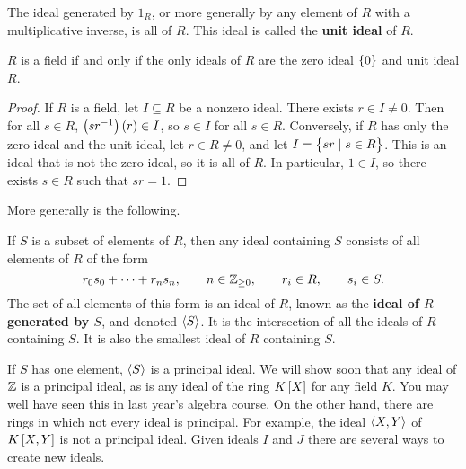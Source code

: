 \begin{note*}
The ideal generated by $ 1_R $, or more generally by any element of $ R $ with a multiplicative inverse, is all of $ R $. This ideal is called the \textbf{unit ideal} of $ R $.
\end{note*}

\begin{proposition}
$ R $ is a field if and only if the only ideals of $ R $ are the zero ideal $ \cbr{0} $ and unit ideal $ R $.
\end{proposition}

\begin{proof}
If $ R $ is a field, let $ I \subseteq R $ be a nonzero ideal. There exists $ r \in I \ne 0 $. Then for all $ s \in R $, $ \br{sr^{-1}}\br{r} \in I $, so $ s \in I $ for all $ s \in R $. Conversely, if $ R $ has only the zero ideal and the unit ideal, let $ r \in R \ne 0 $, and let $ I = \cbr{sr \mid s \in R} $. This is an ideal that is not the zero ideal, so it is all of $ R $. In particular, $ 1 \in I $, so there exists $ s \in R $ such that $ sr = 1 $.
\end{proof}

More generally is the following.

\begin{definition}
If $ S $ is a subset of elements of $ R $, then any ideal containing $ S $ consists of all elements of $ R $ of the form
$$ r_0s_0 + \dots + r_ns_n, \qquad n \in \mathbb{Z}_{\ge 0}, \qquad r_i \in R, \qquad s_i \in S. $$
The set of all elements of this form is an ideal of $ R $, known as the \textbf{ideal of $ R $ generated by $ S $}, and denoted $ \left\langle S \right\rangle $. It is the intersection of all the ideals of $ R $ containing $ S $. It is also the smallest ideal of $ R $ containing $ S $.
\end{definition}

If $ S $ has one element, $ \left\langle S \right\rangle $ is a principal ideal. We will show soon that any ideal of $ \mathbb{Z} $ is a principal ideal, as is any ideal of the ring $ K\sbr{X} $ for any field $ K $. You may well have seen this in last year's
algebra course. On the other hand, there are rings in which not every ideal is principal. For example, the ideal $ \left\langle X, Y \right\rangle $ of $ K\sbr{X, Y} $ is not a principal ideal. Given ideals $ I $ and $ J $ there are several ways to create new ideals.


